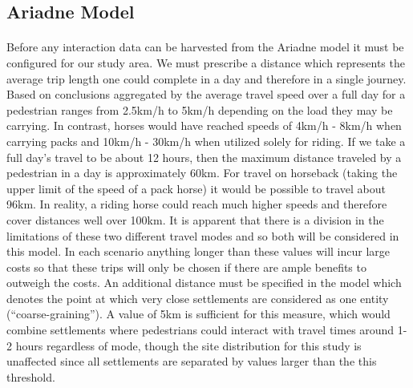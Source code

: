 \documentclass[12pt,a4paper]{thesis}
\begin{document}
\subsection{Ariadne Model}
	
\paragraph{}
Before any interaction data can be harvested from the Ariadne model it must be configured for our study area. We must prescribe a distance which represents the average trip length one could complete in a day and therefore in a single journey. Based on conclusions aggregated by \cite{BevForthcoming} the average travel speed over a full day for a pedestrian ranges from 2.5km/h to 5km/h depending on the load they may be carrying. In contrast, horses would have reached speeds of 4km/h - 8km/h when carrying packs and 10km/h - 30km/h when utilized solely for riding. If we take a full day's travel to be about 12 hours, then the maximum distance traveled by a pedestrian in a day is approximately 60km. For travel on horseback (taking the upper limit of the speed of a pack horse) it would be possible to travel about 96km. In reality, a riding horse could reach much higher speeds and therefore cover distances well over 100km. It is apparent that there is a division in the limitations of these two different travel modes and so both will be considered in this model. In each scenario anything longer than these values will incur large costs so that these trips will only be chosen if there are ample benefits to outweigh the costs. An additional distance must be specified in the model which denotes the point at which very close settlements are considered as one entity (``coarse-graining''). A value of 5km is sufficient for this measure, which would combine settlements where pedestrians could interact with travel times around 1-2 hours regardless of mode, though the site distribution for this study is unaffected since all settlements are separated by values larger than the this threshold. 
\end{document}
